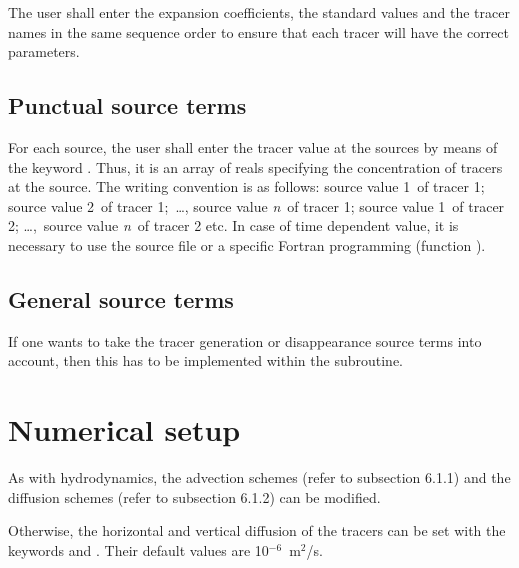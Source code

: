 The user shall enter the expansion coefficients, the standard values and the
tracer names in the same sequence order to ensure that each tracer will have
the correct parameters.

\subsection{Punctual source terms}

For each source, the user shall enter the tracer value at the sources by means
of the keyword . Thus, it is an
array of reals specifying the concentration of tracers at the source. The
writing convention is as follows: source value 1~of tracer 1; source value 2~of
tracer 1;~\dots , source value \textit{n}~of tracer 1; source value 1~of tracer
2; \dots ,~source value \textit{n}~of tracer 2 etc. In case of time dependent
value, it is necessary to use the source file or a specific Fortran programming
(function ).


\subsection{General source terms}

If one wants to take the tracer generation or disappearance source terms into
account, then this has to be implemented within the 
subroutine.

\section{Numerical setup}

As with hydrodynamics, the advection schemes  (refer to subsection 6.1.1) and the diffusion schemes  (refer to subsection 6.1.2) can be modified.

Otherwise, the horizontal and vertical diffusion of the tracers can be set with
the keywords  and
. Their default values
are 10${}^{-6}$~m${}^{2}$/s.

